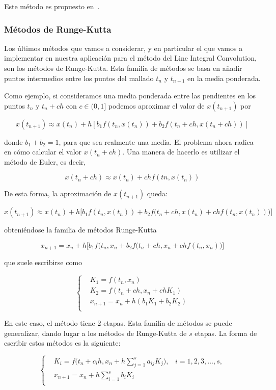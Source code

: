 Este método es propuesto en~\citet{osti_10185520}.

\subsubsection{Métodos de Runge-Kutta}
\label{makereference5.4.3.3}

Los últimos métodos que vamos a considerar, y en particular el que vamos a
implementar en nuestra aplicación para el método del Line Integral Convolution,
son los métodos de Runge-Kutta. Esta familia de métodos se basa en añadir puntos
intermedios entre los puntos del mallado $t_n$ y $t_{n+1}$ en la media
ponderada. 

Como ejemplo, si consideramos una media ponderada entre las pendientes en los
puntos $t_n$ y $t_n + ch$ con $c \in (0,1]$ podemos aproximar el valor de
$x(t_{n+1})$ por 

\[x(t_{n+1}) \approx x(t_n) + h\left[ b_1f(t_n,x(t_n)) + b_2f(t_n + ch,
x(t_n+ch))\right]\]

donde $b_1 + b_2 = 1$, para que sea realmente una media. El problema ahora
radica en cómo calcular el valor $x(t_n +ch)$. Una manera de hacerlo es utilizar
el método de Euler, es decir,

\[x(t_n + ch) \approx x(t_n) + chf(tn,x(t_n))\]

De esta forma, la aproximación de $x(t_{n+1})$ queda:

\[x(t_{n+1}) \approx x(t_n) + h\Big[ b_1f(t_n,x(t_n)) + b_2f\Big(t_n+ch,x(t_n) +
		chf(t_n,x(t_n))\Big)\Big] \]

obteniéndose la familia de métodos Runge-Kutta

\[ x_{n+1} = x_n + h\Big[b_1f(t_n,x_n + b_2f\Big(t_n + ch, x_n +
chf(t_n,x_n)\Big)\Big] \]

que suele escribirse como

\[ \left\{ 
		\begin{aligned}
		& K_1 = f(t_n,x_n) \\
		& K_2 = f(t_n + ch, x_n + chK_1) \\
		& x_{n+1} = x_n + h(b_1K_1 + b_2K_2) \\
		\end{aligned}
	\right. \]

En este caso, el método tiene $2$ etapas. Esta familia de métodos se puede
generalizar, dando lugar a los métodos de Runge-Kutta de $s$ etapas. La
forma de escribir estos métodos es la siguiente:

\begin{equation}
	\left\{	
		\begin{aligned}
			& K_i = f\bigg(t_n + c_ih,x_n + h\sum_{j=1}^sa_{ij}K_j\bigg),
			\;\;\; i=1,2,3,\ldots,s, \\
			& x_{n+1} = x_n + h\sum_{i=1}^sb_iK_i \\
		\end{aligned}
		\right.
\end{equation}

